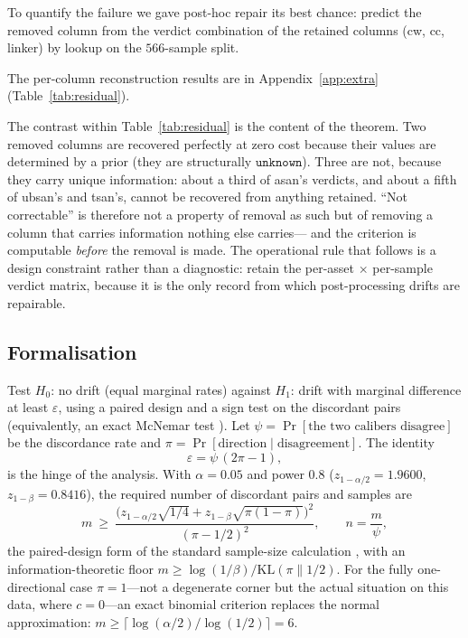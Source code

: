 \documentclass{article}
\newcommand{\unk}{\texttt{unknown}}
\begin{document}
To quantify the failure we gave post-hoc repair its best chance: predict the removed column from the verdict
combination of the retained columns (cw, cc, linker) by lookup on the $566$-sample split.


The per-column reconstruction results are in Appendix~\ref{app:extra} (Table~\ref{tab:residual}).


The contrast within Table~\ref{tab:residual} is the content of the theorem. Two removed columns are
recovered perfectly at zero cost because their values are determined by a prior (they are structurally
$\unk$). Three are not, because they carry unique information: about a third of asan's verdicts, and about a
fifth of ubsan's and tsan's, cannot be recovered from anything retained. ``Not correctable'' is therefore
not a property of removal as such but of removing a column that carries information nothing else carries---
and the criterion is computable \emph{before} the removal is made. The operational rule that follows is a
design constraint rather than a diagnostic: retain the per-asset $\times$ per-sample verdict matrix, because
it is the only record from which post-processing drifts are repairable.

\label{sec:sample}

\subsection{Formalisation}
\label{sec:sampleform}

Test $H_0$: no drift (equal marginal rates) against $H_1$: drift with marginal difference at least
$\varepsilon$, using a paired design and a sign test on the discordant pairs (equivalently, an exact
McNemar test \citep{mcnemar1947note}). Let $\psi=\Pr[\text{the two calibers disagree}]$ be the discordance
rate and $\pi=\Pr[\text{direction}\mid\text{disagreement}]$. The identity
\begin{equation}
\varepsilon=\psi\,(2\pi-1),
\label{eq:epspsi}
\end{equation}
is the hinge of the analysis. With $\alpha=0.05$ and power $0.8$
\citep{cohen1988statistical} ($z_{1-\alpha/2}=1.9600$, $z_{1-\beta}=0.8416$), the required number of
discordant pairs and samples are
\begin{equation}
m\ \ge\ \frac{\bigl(z_{1-\alpha/2}\sqrt{1/4}+z_{1-\beta}\sqrt{\pi(1-\pi)}\bigr)^{2}}{(\pi-1/2)^{2}},
\qquad n=\frac{m}{\psi},
\label{eq:sample}
\end{equation}
the paired-design form of the standard sample-size calculation \citep{connor1987sample}, with an
information-theoretic floor $m\ge\log(1/\beta)/\mathrm{KL}(\pi\|1/2)$. For the fully
one-directional case $\pi=1$---not a degenerate corner but the actual situation on this data, where
$c=0$---an exact binomial criterion replaces the normal approximation:
$m\ge\lceil\log(\alpha/2)/\log(1/2)\rceil=6$.
\end{document}
